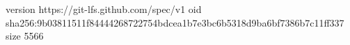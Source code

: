 version https://git-lfs.github.com/spec/v1
oid sha256:9b03811511f84444268722754bdcea1b7e3bc6b5318d9ba6bf7386b7c11ff337
size 5566
